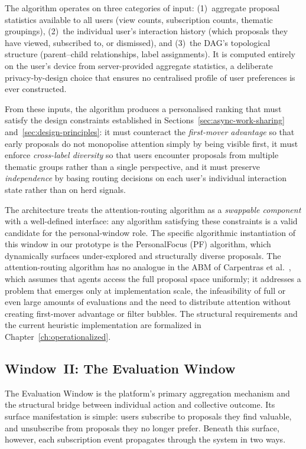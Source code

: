 \documentclass[a4paper, 12pt, twoside]{iviathesis}
\begin{document}
The algorithm operates on three categories of input: (1)~aggregate proposal statistics available to all users (view counts, subscription counts, thematic groupings), (2)~the individual user's interaction history (which proposals they have viewed, subscribed to, or dismissed), and (3)~the DAG's topological structure (parent--child relationships, label assignments). It is computed entirely on the user's device from server-provided aggregate statistics, a deliberate privacy-by-design choice that ensures no centralised profile of user preferences is ever constructed.

From these inputs, the algorithm produces a personalised ranking that must satisfy the design constraints established in Sections~\ref{sec:async-work-sharing} and~\ref{sec:design-principles}: it must counteract the \textit{first-mover advantage} so that early proposals do not monopolise attention simply by being visible first, it must enforce \textit{cross-label diversity} so that users encounter proposals from multiple thematic groups rather than a single perspective, and it must preserve \textit{independence} by basing routing decisions on each user's individual interaction state rather than on herd signals.

The architecture treats the attention-routing algorithm as a \textit{swappable component} with a well-defined interface: any algorithm satisfying these constraints is a valid candidate for the personal-window role. The specific algorithmic instantiation of this window in our prototype is the PersonalFocus (PF) algorithm, which dynamically surfaces under-explored and structurally diverse proposals. The attention-routing algorithm has no analogue in the ABM of Carpentras et al.\ \cite{carpentras_wisdom_2025}, which assumes that agents access the full proposal space uniformly; it addresses a problem that emerges only at implementation scale, the infeasibility of full or even large amounts of  evaluations and the need to distribute attention without creating first-mover advantage or filter bubbles. The structural requirements and the current heuristic implementation are formalized in Chapter~\ref{ch:operationalized}.

\subsection{Window~II: The Evaluation Window}
\label{sec:evaluation-window}

The Evaluation Window is the platform's primary aggregation mechanism and the structural bridge between individual action and collective outcome. Its surface manifestation is simple: users subscribe to proposals they find valuable, and unsubscribe from proposals they no longer prefer. Beneath this surface, however, each subscription event propagates through the system in two ways.
\end{document}
